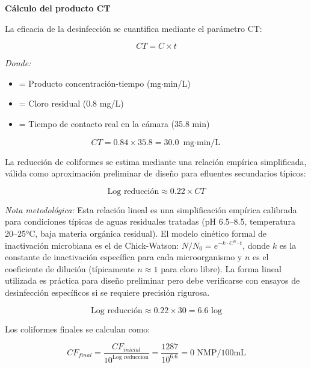 \documentclass[12pt,a4paper]{article}
\begin{document}
\textbf{Cálculo del producto CT}

La eficacia de la desinfección se cuantifica mediante el parámetro CT:

\begin{equation}
CT = C \times t
\end{equation}

\textit{Donde:}
\begin{itemize}[noitemsep,leftmargin=2em]
    \item[$CT$] = Producto concentración-tiempo (mg$\cdot$min/L)
    \item[$C$] = Cloro residual (0.8 mg/L)
    \item[$t$] = Tiempo de contacto real en la cámara (35.8 min)
\end{itemize}

\begin{equation}
CT = 0.84 \times 35.8 = 30.0 \text{ mg$\cdot$min/L}
\end{equation}

La reducción de coliformes se estima mediante una relación empírica simplificada, válida como aproximación preliminar de diseño para efluentes secundarios típicos:

\begin{equation}
\text{Log reducción} \approx 0.22 \times CT
\end{equation}

\textit{Nota metodológica:} Esta relación lineal es una simplificación empírica calibrada para condiciones típicas de aguas residuales tratadas (pH 6.5--8.5, temperatura 20--25°C, baja materia orgánica residual). El modelo cinético formal de inactivación microbiana es el de Chick-Watson: $N/N_0 = e^{-k \cdot C^n \cdot t}$, donde $k$ es la constante de inactivación específica para cada microorganismo y $n$ es el coeficiente de dilución (típicamente $n \approx 1$ para cloro libre). La forma lineal utilizada es práctica para diseño preliminar pero debe verificarse con ensayos de desinfección específicos si se requiere precisión rigurosa.

\begin{equation}
\text{Log reducción} \approx 0.22 \times 30 = 6.6 \text{ log}
\end{equation}

Los coliformes finales se calculan como:

\begin{equation}
CF_{final} = \frac{CF_{inicial}}{10^{\text{Log reduccion}}} = \frac{1287}{10^{6.6}} = 0 \text{ NMP/100mL}
\end{equation}
\end{document}
